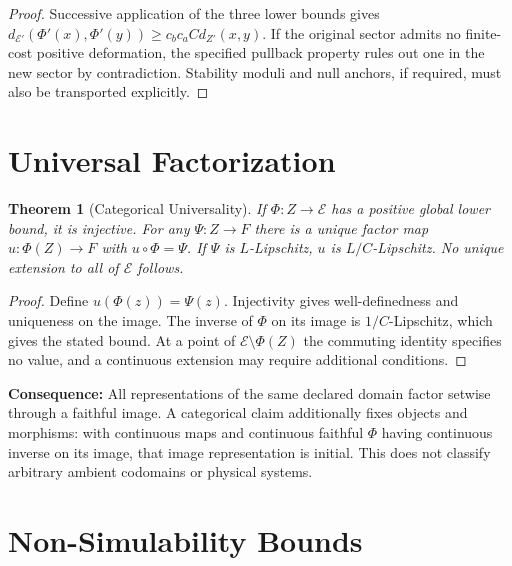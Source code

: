 \documentclass[11pt,a4paper]{article}
\theoremstyle{plain}
\newtheorem{theorem}{Theorem}[section]
\theoremstyle{definition}
\theoremstyle{remark}
\newcommand{\E}{\mathcal{E}}
\begin{document}
\begin{proof}
Successive application of the three lower bounds gives $d_{\E'}(\Phi'(x),\Phi'(y))\geq c_bc_aC d_{Z'}(x,y)$. If the original sector admits no finite-cost positive deformation, the specified pullback property rules out one in the new sector by contradiction. Stability moduli and null anchors, if required, must also be transported explicitly.
\end{proof}

\section{Universal Factorization}\label{app:universal-factorization}

\begin{theorem}[Categorical Universality]
If $\Phi:Z\to\E$ has a positive global lower bound, it is injective. For any $\Psi:Z\to F$ there is a unique factor map $u:\Phi(Z)\to F$ with $u\circ\Phi=\Psi$. If $\Psi$ is $L$-Lipschitz, $u$ is $L/C$-Lipschitz. No unique extension to all of $\E$ follows.
\end{theorem}

\begin{proof}
Define $u(\Phi(z))=\Psi(z)$. Injectivity gives well-definedness and uniqueness on the image. The inverse of $\Phi$ on its image is $1/C$-Lipschitz, which gives the stated bound. At a point of $\E\setminus\Phi(Z)$ the commuting identity specifies no value, and a continuous extension may require additional conditions.
\end{proof}

\textbf{Consequence:} All representations of the same declared domain factor setwise through a faithful image. A categorical claim additionally fixes objects and morphisms: with continuous maps and continuous faithful $\Phi$ having continuous inverse on its image, that image representation is initial. This does not classify arbitrary ambient codomains or physical systems.

\section{Non-Simulability Bounds}\label{app:prefix-bounds}
\end{document}
